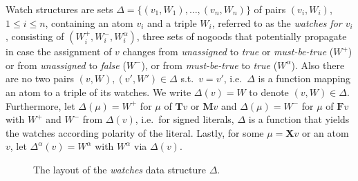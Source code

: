 \documentclass{vutinfth} %
\theoremstyle{example}
\theoremstyle{definition}
\theoremstyle{theorem}
\theoremstyle{lemma}
\theoremstyle{corollary}
\newcommand{\mbt}{must-be-true}
\newcommand{\bT}{\mathbf{T}}
\newcommand{\bM}{\mathbf{M}}
\newcommand{\bF}{\mathbf{F}}
\newcommand{\bX}{\mathbf{X}}
\newcommand{\sgl}{\mu}
\begin{document}

Watch structures are sets $\Delta = \{ (v_1, W_1), \ldots, (v_n, W_n) \}$ of pairs $(v_i, W_i)$, $1 \leq i \leq n$, containing an atom $v_i$ and a triple $W_i$, referred to as the \emph{watches for $v_i$}, consisting of $(W_i^+, W_i^-, W_i^\alpha)$, three sets of nogoods that potentially propagate in case the assignment of $v$ changes from \emph{unassigned} to \emph{true} or \emph{\mbt} ($W^+$) or from \emph{unassigned} to \emph{false} ($W^-$), or from \emph{\mbt} to \emph{true} ($W^\alpha$). Also there are no two pairs $(v, W), (v', W') \in \Delta$ s.t.~$v = v'$, i.e.~$\Delta$ is a function mapping an atom to a triple of its watches. We write $\Delta(v) = W$ to denote $(v, W) \in \Delta$. Furthermore, let $\Delta(\sgl) = W^+$ for $\sgl$ of $\bT v$ or $\bM v$ and $\Delta(\sgl) = W^-$ for $\sgl$ of $\bF v$ with $W^+$ and $W^-$ from $\Delta(v)$, i.e.~for signed literals, $\Delta$ is a function that yields the watches according polarity of the literal. Lastly, for some $\sgl = \bX v$ or an atom $v$, let $\Delta^\alpha(v) = W^\alpha$ with $W^\alpha$ via $\Delta(v)$.

\begin{figure}[h]
  \centering
{}
  \caption{The layout of the \emph{watches} data structure $\Delta$.}
  \label{fig:watches} %
\end{figure}
\end{document}
